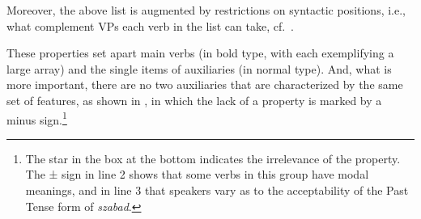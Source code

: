 \documentclass[output=paper]{langsci/langscibook}
\begin{document}
Moreover, the above list is augmented by restrictions on syntactic positions,
i.e., what complement VPs each verb in the list can take, cf.\ .

\ea\label{ex:key:27.12} 
    \z
\z

These properties set apart main verbs (in bold type, with each exemplifying a
large array) and the single items of auxiliaries (in normal type). And, what is
more important, there are no two auxiliaries that are characterized by the same
set of features, as shown in , in which the lack of a
property is marked by a minus sign.\footnote{The star in the box at the bottom
    indicates the irrelevance of the property. The ± sign in line 2 shows that
    some verbs in this group have modal meanings, and in line 3 that speakers
    vary as to the acceptability of the Past Tense form of \emph{szabad}.}
\end{document}
